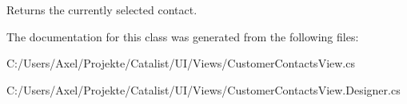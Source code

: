 Returns the currently selected contact. 



The documentation for this class was generated from the following files\+:\begin{DoxyCompactItemize}
\item 
C\+:/\+Users/\+Axel/\+Projekte/\+Catalist/\+U\+I/\+Views/Customer\+Contacts\+View.\+cs\item 
C\+:/\+Users/\+Axel/\+Projekte/\+Catalist/\+U\+I/\+Views/Customer\+Contacts\+View.\+Designer.\+cs\end{DoxyCompactItemize}
